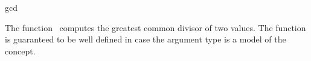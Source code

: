 \begin{ccRefFunction}{gcd}

\ccDefinition

The function \ccRefName\ computes the greatest common divisor of two values.
The function is guaranteed to be well defined in case the argument type 
is a model of the  concept.



\ccSeeAlso

\\
\\

\end{ccRefFunction}
